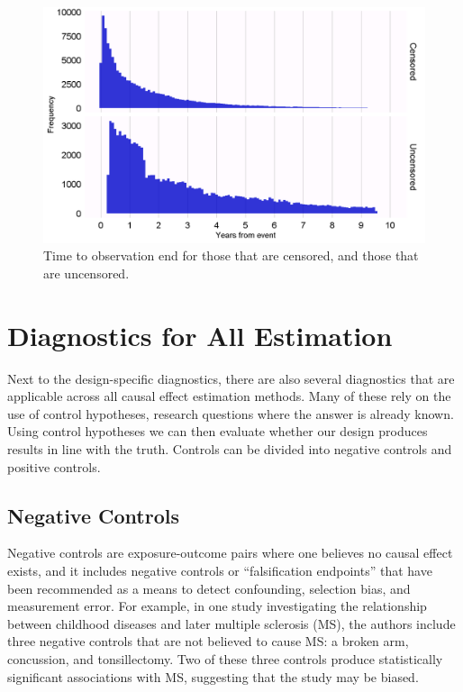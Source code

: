 \documentclass[11pt]{book}
\theoremstyle{definition}
\theoremstyle{definition}
\theoremstyle{definition}
\theoremstyle{remark}
\begin{document}
\begin{figure}

{\centering \includegraphics[width=1\linewidth]{images/MethodValidity/timeToObsEnd} 

}

\caption{Time to observation end for those that are censored, and those that are uncensored.}\label{fig:timeToObsEnd}
\end{figure}

\section{Diagnostics for All
Estimation}\label{diagnostics-for-all-estimation}

Next to the design-specific diagnostics, there are also several
diagnostics that are applicable across all causal effect estimation
methods. Many of these rely on the use of control hypotheses, research
questions where the answer is already known. Using control hypotheses we
can then evaluate whether our design produces results in line with the
truth. Controls can be divided into negative controls and positive
controls.

\subsection{Negative Controls}\label{NegativeControls}


Negative controls are exposure-outcome pairs where one believes no
causal effect exists, and it includes negative controls or
``falsification endpoints'' \citep{prased_2013} that have been
recommended as a means to detect confounding, \citep{lipsitch_2010}
selection bias, and measurement error. \citep{arnold_2016} For example,
in one study \citep{zaadstra_2008} investigating the relationship
between childhood diseases and later multiple sclerosis (MS), the
authors include three negative controls that are not believed to cause
MS: a broken arm, concussion, and tonsillectomy. Two of these three
controls produce statistically significant associations with MS,
suggesting that the study may be biased.
\end{document}
